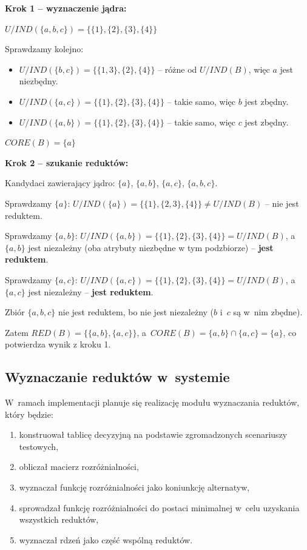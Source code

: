 \documentclass[12pt,a4paper,oneside]{article}
\begin{document}
\textbf{Krok 1 -- wyznaczenie jądra:}

$U/IND(\{a,b,c\}) = \{\{1\}, \{2\}, \{3\}, \{4\}\}$

Sprawdzamy kolejno:
\begin{itemize}
    \item $U/IND(\{b,c\}) = \{\{1,3\}, \{2\}, \{4\}\}$ -- różne od $U/IND(B)$, więc $a$ jest niezbędny.
    \item $U/IND(\{a,c\}) = \{\{1\}, \{2\}, \{3\}, \{4\}\}$ -- takie samo, więc $b$ jest zbędny.
    \item $U/IND(\{a,b\}) = \{\{1\}, \{2\}, \{3\}, \{4\}\}$ -- takie samo, więc $c$ jest zbędny.
\end{itemize}

$CORE(B) = \{a\}$

\textbf{Krok 2 -- szukanie reduktów:}

Kandydaci zawierający jądro: $\{a\}$, $\{a,b\}$, $\{a,c\}$, $\{a,b,c\}$.

Sprawdzamy $\{a\}$: $U/IND(\{a\}) = \{\{1\}, \{2,3\}, \{4\}\} \neq U/IND(B)$ -- nie jest reduktem.

Sprawdzamy $\{a,b\}$: $U/IND(\{a,b\}) = \{\{1\}, \{2\}, \{3\}, \{4\}\} = U/IND(B)$, a~$\{a,b\}$ jest niezależny (oba atrybuty niezbędne w tym podzbiorze) -- \textbf{jest reduktem}.

Sprawdzamy $\{a,c\}$: $U/IND(\{a,c\}) = \{\{1\}, \{2\}, \{3\}, \{4\}\} = U/IND(B)$, a~$\{a,c\}$ jest niezależny -- \textbf{jest reduktem}.

Zbiór $\{a,b,c\}$ nie jest reduktem, bo nie jest niezależny ($b$ i~$c$ są w~nim zbędne).

Zatem $RED(B) = \{\{a,b\}, \{a,c\}\}$, a~$CORE(B) = \{a,b\} \cap \{a,c\} = \{a\}$, co potwierdza wynik z kroku 1.

\newpage

\subsection{Wyznaczanie reduktów w~systemie}

W~ramach implementacji planuje się realizację modułu wyznaczania reduktów, który będzie:
\begin{enumerate}
    \item konstruował tablicę decyzyjną na podstawie zgromadzonych scenariuszy testowych,
    \item obliczał macierz rozróżnialności,
    \item wyznaczał funkcję rozróżnialności jako koniunkcję alternatyw,
    \item sprowadzał funkcję rozróżnialności do postaci minimalnej w~celu uzyskania wszystkich reduktów,
    \item wyznaczał rdzeń jako część wspólną reduktów.
\end{enumerate}
\end{document}
